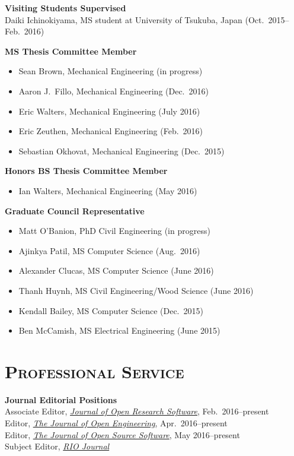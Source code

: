 \documentclass[margin,line,11pt]{res}
\begin{document}
\begin{resume}
\textbf{Visiting Students Supervised} \\
Daiki Ichinokiyama, MS student at University of Tsukuba, Japan (Oct.\ 2015--Feb.\ 2016)


\textbf{MS Thesis Committee Member}
\begin{itemize}[leftmargin=*]
\item Sean Brown, Mechanical Engineering (in progress)
\item Aaron J.~Fillo, Mechanical Engineering (Dec.\ 2016)
\item Eric Walters, Mechanical Engineering (July 2016)
\item Eric Zeuthen, Mechanical Engineering (Feb.\ 2016)
\item Sebastian Okhovat, Mechanical Engineering (Dec.\ 2015)
\end{itemize}

\textbf{Honors BS Thesis Committee Member}
\begin{itemize}[leftmargin=*]
\item Ian Walters, Mechanical Engineering (May 2016)
\end{itemize}

\textbf{Graduate Council Representative}
\begin{itemize}[leftmargin=*]
\item Matt O'Banion, PhD Civil Engineering (in progress)
\item Ajinkya Patil, MS Computer Science (Aug.\ 2016)
\item Alexander Clucas, MS Computer Science (June 2016)
\item Thanh Huynh, MS Civil Engineering\slash Wood Science (June 2016)
\item Kendall Bailey, MS Computer Science (Dec.\ 2015)
\item Ben McCamish, MS Electrical Engineering (June 2015)
\end{itemize}

\section{\textsc{Professional Service}}

\textbf{Journal Editorial Positions} \\
Associate Editor, \href{http://openresearchsoftware.metajnl.com}{\emph{Journal of Open Research Software}}, Feb.\ 2016--present \\
Editor, \href{http://www.tjoe.org}{\emph{The Journal of Open Engineering}}, Apr.\ 2016--present \\
Editor, \href{http://joss.theoj.org}{\emph{The Journal of Open Source Software}}, May 2016--present \\
Subject Editor, \href{http://riojournal.com}{\emph{RIO Journal}}


\end{resume}
\end{document}
